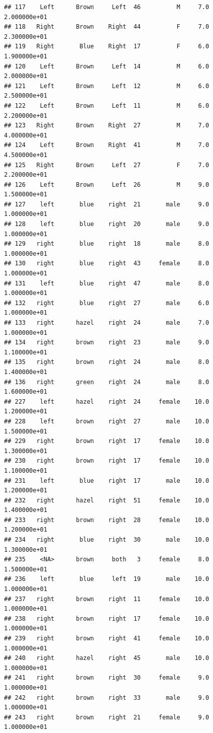 \documentclass[]{article}
\begin{document}
\begin{verbatim}
## 117    Left      Brown     Left  46          M     7.0  2.000000e+01
## 118   Right      Brown    Right  44          F     7.0  2.300000e+01
## 119   Right       Blue    Right  17          F     6.0  1.900000e+01
## 120    Left      Brown     Left  14          M     6.0  2.000000e+01
## 121    Left      Brown     Left  12          M     6.0  2.500000e+01
## 122    Left      Brown     Left  11          M     6.0  2.200000e+01
## 123   Right      Brown    Right  27          M     7.0  4.000000e+01
## 124    Left      Brown    Right  41          M     7.0  4.500000e+01
## 125   Right      Brown     Left  27          F     7.0  2.200000e+01
## 126    Left      Brown     Left  26          M     9.0  1.500000e+01
## 127    left       blue    right  21       male     9.0  1.000000e+01
## 128    left       blue    right  20       male     9.0  1.000000e+01
## 129   right       blue    right  18       male     8.0  1.000000e+01
## 130   right       blue    right  43     female     8.0  1.000000e+01
## 131    left       blue    right  47       male     8.0  1.000000e+01
## 132   right       blue    right  27       male     6.0  1.000000e+01
## 133   right      hazel    right  24       male     7.0  1.000000e+01
## 134   right      brown    right  23       male     9.0  1.100000e+01
## 135   right      brown    right  24       male     8.0  1.400000e+01
## 136   right      green    right  24       male     8.0  1.600000e+01
## 227    left      hazel    right  24     female    10.0  1.200000e+01
## 228    left      brown    right  27       male    10.0  1.500000e+01
## 229   right      brown    right  17     female    10.0  1.300000e+01
## 230   right      brown    right  17     female    10.0  1.100000e+01
## 231    left       blue    right  17       male    10.0  1.200000e+01
## 232   right      hazel    right  51     female    10.0  1.400000e+01
## 233   right      brown    right  28     female    10.0  1.200000e+01
## 234   right       blue    right  30       male    10.0  1.300000e+01
## 235    <NA>      brown     both   3     female     8.0  1.500000e+01
## 236    left       blue     left  19       male    10.0  1.000000e+01
## 237   right      brown    right  11     female    10.0  1.000000e+01
## 238   right      brown    right  17     female    10.0  1.000000e+01
## 239   right      brown    right  41     female    10.0  1.000000e+01
## 240   right      hazel    right  45       male    10.0  1.000000e+01
## 241   right      brown    right  30     female     9.0  1.000000e+01
## 242   right      brown    right  33       male     9.0  1.000000e+01
## 243   right      brown    right  21     female     9.0  1.000000e+01

\end{verbatim}
\end{document}

